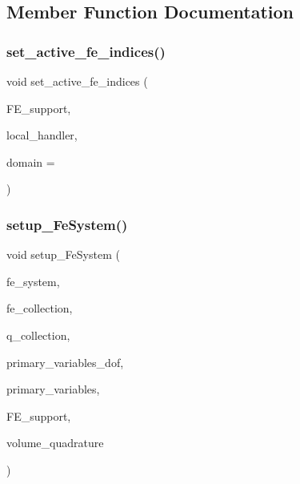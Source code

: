 \subsection{Member Function Documentation}
\mbox{\label{classhp_f_e_m_a12205240784051ad249a536cb7ee98d5}} 
\subsubsection{\texorpdfstring{set\+\_\+active\+\_\+fe\+\_\+indices()}{set\_active\_fe\_indices()}}
{\footnotesize\ttfamily void set\+\_\+active\+\_\+fe\+\_\+indices (\begin{DoxyParamCaption}\item[{std\+::vector$<$ std\+::vector$<$ int $>$ $>$ \&}]{F\+E\+\_\+support,  }\item[{hp\+::\+Do\+F\+Handler$<$ dim $>$ \&}]{local\+\_\+handler,  }\item[{int}]{domain = {} }\end{DoxyParamCaption})}

\mbox{\label{classhp_f_e_m_afe86b756fb757221f5a8a16c956b7e76}} 
\subsubsection{\texorpdfstring{setup\+\_\+\+Fe\+System()}{setup\_FeSystem()}}
{\footnotesize\ttfamily void setup\+\_\+\+Fe\+System (\begin{DoxyParamCaption}\item[{std\+::vector$<$ std\+::shared\+\_\+ptr$<$ F\+E\+System$<$ dim $>$$>$ $>$ \&}]{fe\+\_\+system,  }\item[{hp\+::\+F\+E\+Collection$<$ dim $>$ \&}]{fe\+\_\+collection,  }\item[{hp\+::\+Q\+Collection$<$ dim $>$ \&}]{q\+\_\+collection,  }\item[{std\+::vector$<$ unsigned int $>$ \&}]{primary\+\_\+variables\+\_\+dof,  }\item[{std\+::vector$<$ std\+::vector$<$ std\+::string $>$ $>$ \&}]{primary\+\_\+variables,  }\item[{std\+::vector$<$ std\+::vector$<$ int $>$ $>$ \&}]{F\+E\+\_\+support,  }\item[{const Q\+Gauss$<$ dim $>$ \&}]{volume\+\_\+quadrature }\end{DoxyParamCaption})}

